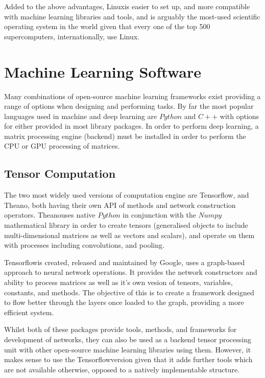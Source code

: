 \documentclass[fleqn,twoside,12pt]{report}
\begin{document}
Added to the above advantages, Linux\textregistered is easier to set up, and more compatible with machine learning libraries and tools, and is arguably the most-used scientific operating system in the world given that every one of the top 500 supercomputers, internationally, use Linux\textregistered.


\section{Machine Learning Software}


Many combinations of open-source machine learning frameworks exist providing a range of options when designing and performing tasks. By far the most popular languages used in machine and deep learning are $Python$ and $C++$ with options for either provided in most library packages. In order to perform deep learning, a matrix processing engine (backend) must be installed in order to perform the CPU or GPU processing of matrices.



\subsection{Tensor Computation}

The two most widely used versions of computation engine are Tensorflow\textregistered, and Theano\textregistered, both having their own API of methods and network construction operators. Theano\textregistered uses native $Python$ in conjunction with the $Numpy$ mathematical library in order to create tensors (generalised objects to include multi-dimensional matrices as well as vectors and scalars), and operate on them with processes including convolutions, and pooling.  

Tensorflow\textregistered is created, released and maintained by Google\textregistered, uses a graph-based approach to neural network operations. It provides the network constructors and ability to process matrices as well as it's own vesion of tensors, variables, constants, and methods. The objective of this is to create a framework designed to flow better through the layers once loaded to the graph, providing a more efficient system. 

Whilst both of these packages provide tools, methods, and frameworks for development of networks, they can also be used as a backend tensor processing unit with other open-source machine learning libraries using them. However, it makes sense to use the Tensorflow\textregistered version given that it adds further tools which are not available otherwise, opposed to a natively implementable structure.
\end{document}
